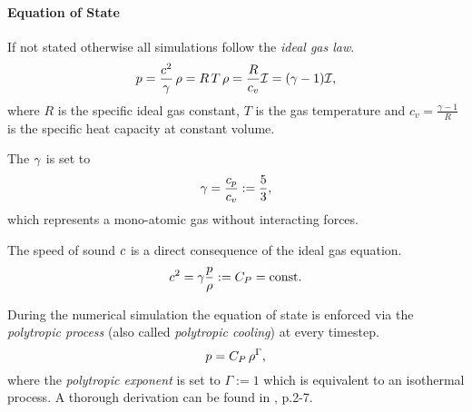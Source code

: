 \paragraph{Equation of State}
If not stated otherwise all simulations follow the \emph{ideal gas law}.
\begin{equation}
p = \frac{c^2}{\gamma} \, \rho = R\,T\,\rho = \frac{R}{c_v} \mathcal{I} = (\gamma - 1) \mathcal{I},
\end{equation}
where $R$ is the specific ideal gas constant, $T$ is the gas temperature and $c_v
= \frac{\gamma - 1}{R}$ is the specific heat capacity at constant volume. 

The  $\gamma$ is set to
\begin{equation}
\label{eqn:adiabconst}
    \gamma = \frac{c_p}{c_v} := \frac{5}{3},
\end{equation}
which represents a mono-atomic gas without interacting forces.

The speed of sound $c$ is a direct consequence of the ideal gas
equation.  \begin{equation} c^2 = \gamma \frac{p}{\rho} := C_P = \text{const.} \end{equation}

During the numerical simulation the equation of state is enforced via the
\emph{polytropic process} (also called \emph{polytropic cooling}) at
every timestep.
\begin{equation}
p = C_P \, \rho^\Gamma,
\end{equation}
where the \emph{polytropic exponent} is set to $\Gamma := 1$ which is
equivalent to an isothermal process. A thorough derivation can be found in
\cite{Horedt2004}, p.2-7.


